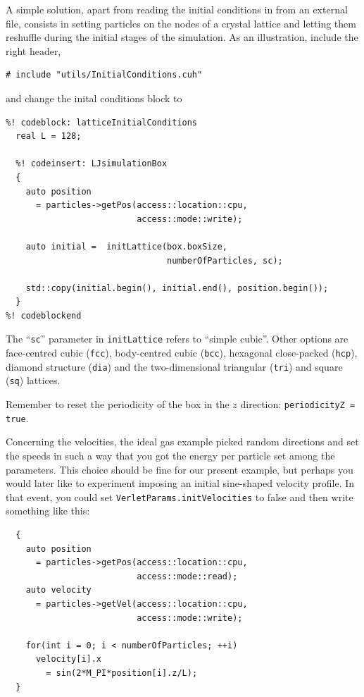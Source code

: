 A simple solution, apart from reading the initial conditions in from an external 
file, consists in setting particles on the nodes of a crystal lattice and 
letting them reshuffle during the initial stages of the simulation. As an
illustration, include the right header,
\begin{lstlisting}
# include "utils/InitialConditions.cuh"
\end{lstlisting}
and change the inital conditions block to
\begin{lstlisting}
%! codeblock: latticeInitialConditions
  real L = 128;

  %! codeinsert: LJsimulationBox
  {
    auto position
      = particles->getPos(access::location::cpu,
                          access::mode::write);

    auto initial =  initLattice(box.boxSize,
                                numberOfParticles, sc);

    std::copy(initial.begin(), initial.end(), position.begin());
  }
%! codeblockend
\end{lstlisting}
The ``\texttt{sc}'' parameter in \texttt{initLattice} refers to ``simple
cubic''. Other options are face-centred cubic (\texttt{fcc}), body-centred cubic
(\texttt{bcc}), hexagonal close-packed (\texttt{hcp}), diamond structure
(\texttt{dia}) and the two-dimensional triangular (\texttt{tri}) and square
(\texttt{sq}) lattices.

Remember to reset the periodicity of the box in the $z$ direction:
\texttt{periodicityZ = true}.

Concerning the velocities, the ideal gas example picked random directions and set
the speeds in such a way that you got the energy per particle set among the
parameters. This choice should be fine for our present example, but perhaps you
would later like to experiment imposing an initial sine-shaped velocity profile.
In that event, you could set \texttt{VerletParams.initVelocities} to false and
then write something like this:
\begin{lstlisting}
  {
    auto position
      = particles->getPos(access::location::cpu,
                          access::mode::read);
    auto velocity
      = particles->getVel(access::location::cpu,
                          access::mode::write);

    for(int i = 0; i < numberOfParticles; ++i)
      velocity[i].x
        = sin(2*M_PI*position[i].z/L);
  }
\end{lstlisting}


